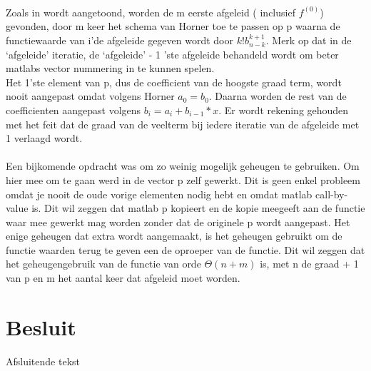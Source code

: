 \documentclass[a4paper,kulak]{kulakarticle}
\begin{document}
~\\~\\~\\
Zoals in \cite{bultheel2006inleiding} wordt aangetoond, worden de m eerste afgeleid ( inclusief $f^{(0)}$) gevonden, door m keer het schema van Horner toe te passen op p waarna de functiewaarde van i'de afgeleide gegeven wordt door $k!b^{k+1}_{n-k}$. Merk op dat in de `afgeleide' iteratie, de `afgeleide' - 1 'ste afgeleide behandeld wordt om beter matlabs vector nummering in te kunnen spelen.\\
Het 1'ste element van p, dus de coefficient van de hoogste graad term, wordt nooit aangepast omdat volgens Horner $a_0 = b_0$. Daarna worden de rest van de coefficienten aangepast volgens $b_i = a_i + b_{i-1}*x$. Er wordt rekening gehouden met het feit dat de graad van de veelterm bij iedere iteratie van de afgeleide met 1 verlaagd wordt.
~\\~\\Een bijkomende opdracht was om zo weinig mogelijk geheugen te gebruiken. Om hier mee om te gaan werd in de vector p zelf gewerkt. Dit is geen enkel probleem omdat je nooit de oude vorige elementen nodig hebt en omdat matlab call-by-value is. Dit wil zeggen dat matlab p kopieert en de kopie meegeeft aan de functie waar mee gewerkt mag worden zonder dat de originele p wordt aangepast. 
Het enige geheugen dat extra wordt aangemaakt, is het geheugen gebruikt om de functie waarden terug te geven een de oproeper van de functie.
Dit wil zeggen dat het geheugengebruik van de functie van orde $\Theta( n + m )$ is, met n de graad + 1 van p en m het aantal keer dat afgeleid moet worden.

\section*{Besluit}

Afsluitende tekst




\end{document}
